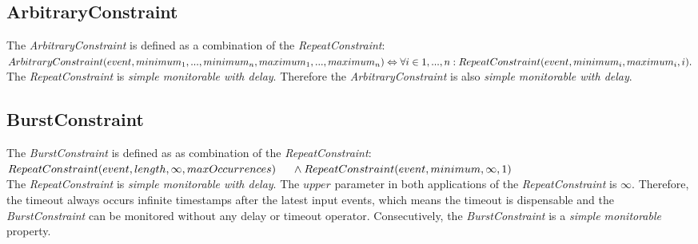 \subsection{ArbitraryConstraint}
	The \emph{ArbitraryConstraint} is defined as a combination of the \emph{RepeatConstraint}:\\[10pt]
	\begin{math}
		ArbitraryConstraint(event, minimum_1, ..., minimum_n, maximum_1, ..., maximum_n)\\
		\Leftrightarrow \forall i\in{1, ..., n}: RepeatConstraint(event, minimum_i, maximum_i, i).
	\end{math}\\[10pt]
	The \emph{RepeatConstraint} is \textit{simple monitorable with delay}. Therefore the \emph{ArbitraryConstraint} is also \textit{simple monitorable with delay}.
	
\subsection{BurstConstraint}
	The \emph{BurstConstraint} is defined as as combination of the \emph{RepeatConstraint}:\\[10pt]
	\begin{math}
		RepeatConstraint(event, length, \infty, maxOccurrences)\\
		\text{\hspace{.5cm}}\land RepeatConstraint(event, minimum, \infty, 1)
	\end{math}\\[10pt]
	The \emph{RepeatConstraint} is \textit{simple monitorable with delay}. The $upper$ parameter in both applications of the \textit{RepeatConstraint} is $\infty$. Therefore, the timeout always occurs infinite timestamps after the latest input events, which means the timeout is dispensable and the \emph{BurstConstraint} can be monitored without any delay or timeout operator. Consecutively, the \emph{BurstConstraint} is a \textit{simple monitorable} property.

